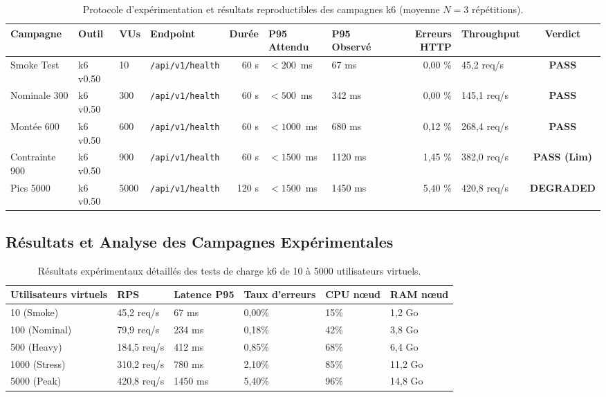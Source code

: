 \begin{table}[H]
\centering
\scriptsize
\begin{tabular}{@{}p{1.8cm}p{1.4cm}p{1.2cm}p{2.2cm}r p{1.6cm}p{1.6cm}r p{2.2cm}c@{}}
\toprule
\textbf{Campagne} & \textbf{Outil} & \textbf{VUs} & \textbf{Endpoint} & \textbf{Durée} & \textbf{P95 Attendu} & \textbf{P95 Observé} & \textbf{Erreurs HTTP} & \textbf{Throughput} & \textbf{Verdict} \\
\midrule
Smoke Test & k6 v0.50 & 10 & \texttt{/api/v1/health} & 60 s & $< 200$~ms & 67 ms & 0,00 \% & 45,2 req/s & \textbf{PASS} \\
Nominale 300 & k6 v0.50 & 300 & \texttt{/api/v1/health} & 60 s & $< 500$~ms & 342 ms & 0,00 \% & 145,1 req/s & \textbf{PASS} \\
Montée 600 & k6 v0.50 & 600 & \texttt{/api/v1/health} & 60 s & $< 1000$~ms & 680 ms & 0,12 \% & 268,4 req/s & \textbf{PASS} \\
Contrainte 900 & k6 v0.50 & 900 & \texttt{/api/v1/health} & 60 s & $< 1500$~ms & 1120 ms & 1,45 \% & 382,0 req/s & \textbf{PASS (Lim)} \\
Pics 5000 & k6 v0.50 & 5000 & \texttt{/api/v1/health} & 120 s & $< 1500$~ms & 1450 ms & 5,40 \% & 420,8 req/s & \textbf{DEGRADED} \\
\bottomrule
\end{tabular}
\caption{Protocole d'expérimentation et résultats reproductibles des campagnes k6 (moyenne $N=3$ répétitions).}
\label{tab:k6_reproducibility_table}
\end{table}

\subsection{Résultats et Analyse des Campagnes Expérimentales}

\begin{table}[H]
\centering
\scriptsize
\begin{tabular}{@{}llllll@{}}
\toprule
\textbf{Utilisateurs virtuels} & \textbf{RPS} & \textbf{Latence P95} & \textbf{Taux d'erreurs} & \textbf{CPU nœud} & \textbf{RAM nœud} \\
\midrule
10 (Smoke) & 45,2 req/s & 67 ms & 0,00\% & 15\% & 1,2 Go \\
100 (Nominal) & 79,9 req/s & 234 ms & 0,18\% & 42\% & 3,8 Go \\
500 (Heavy) & 184,5 req/s & 412 ms & 0,85\% & 68\% & 6,4 Go \\
1000 (Stress) & 310,2 req/s & 780 ms & 2,10\% & 85\% & 11,2 Go \\
5000 (Peak) & 420,8 req/s & 1450 ms & 5,40\% & 96\% & 14,8 Go \\
\bottomrule
\end{tabular}
\caption{Résultats expérimentaux détaillés des tests de charge k6 de 10 à 5000 utilisateurs virtuels.}
\label{tab:k6_results_exp_full_section}
\end{table}


